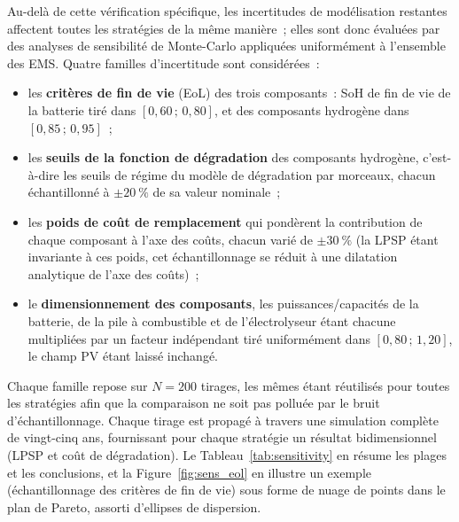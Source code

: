 Au-delà de cette vérification spécifique, les incertitudes de modélisation restantes affectent toutes les stratégies de la même manière~; elles sont donc évaluées par des analyses de sensibilité de Monte-Carlo appliquées uniformément à l'ensemble des EMS. Quatre familles d'incertitude sont considérées~:
\begin{itemize}
  \setlength\itemsep{2pt}
  \item les \textbf{critères de fin de vie} (EoL) des trois composants~: SoH de fin de vie de la batterie tiré dans $[0{,}60\,;\,0{,}80]$, et des composants hydrogène dans $[0{,}85\,;\,0{,}95]$~;
  \item les \textbf{seuils de la fonction de dégradation} des composants hydrogène, c'est-à-dire les seuils de régime du modèle de dégradation par morceaux, chacun échantillonné à $\pm\SI{20}{\percent}$ de sa valeur nominale~;
  \item les \textbf{poids de coût de remplacement} qui pondèrent la contribution de chaque composant à l'axe des coûts, chacun varié de $\pm\SI{30}{\percent}$ (la LPSP étant invariante à ces poids, cet échantillonnage se réduit à une dilatation analytique de l'axe des coûts)~;
  \item le \textbf{dimensionnement des composants}, les puissances/capacités de la batterie, de la pile à combustible et de l'électrolyseur étant chacune multipliées par un facteur indépendant tiré uniformément dans $[0{,}80\,;\,1{,}20]$, le champ PV étant laissé inchangé.
\end{itemize}
Chaque famille repose sur $N = 200$ tirages, les mêmes étant réutilisés pour toutes les stratégies afin que la comparaison ne soit pas polluée par le bruit d'échantillonnage. Chaque tirage est propagé à travers une simulation complète de vingt-cinq ans, fournissant pour chaque stratégie un résultat bidimensionnel (LPSP et coût de dégradation). Le Tableau~\ref{tab:sensitivity} en résume les plages et les conclusions, et la Figure~\ref{fig:sens_eol} en illustre un exemple (échantillonnage des critères de fin de vie) sous forme de nuage de points dans le plan de Pareto, assorti d'ellipses de dispersion.

